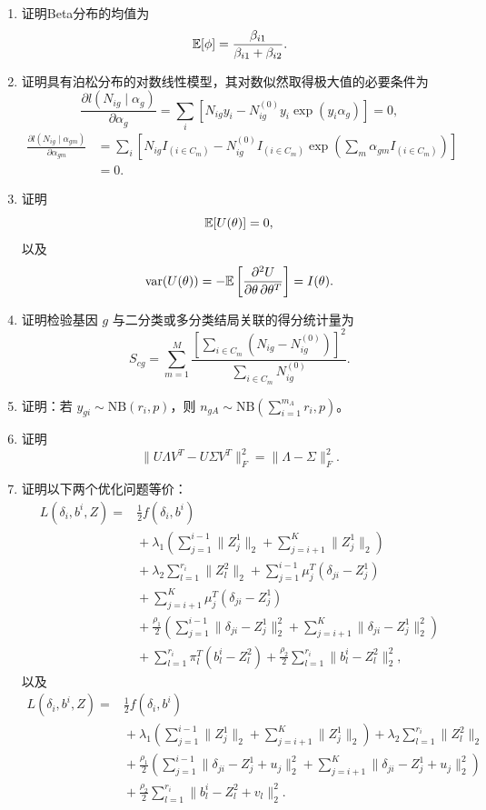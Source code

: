 \begin{enumerate}[label=\textbf{习题\arabic*.},leftmargin=5em]
\item 证明Beta分布的均值为
\[
\mathbb{E}[\phi]=\frac{\beta_{i1}}{\beta_{i1}+\beta_{i2}}.
\]
\item 证明具有泊松分布的对数线性模型，其对数似然取得极大值的必要条件为
\[
\frac{\partial l(N_{ig}\mid\alpha_g)}{\partial\alpha_g}
=\sum_i[N_{ig}y_i-N_{ig}^{(0)}y_i\exp(y_i\alpha_g)]=0,
\]
\[
\begin{aligned}
\frac{\partial l(N_{ig}\mid\alpha_{gm})}{\partial\alpha_{gm}}
&=\sum_i\left[N_{ig}I_{(i\in C_m)}-N_{ig}^{(0)}I_{(i\in C_m)}
\exp\left(\sum_m\alpha_{gm}I_{(i\in C_m)}\right)\right]\\
&=0.
\end{aligned}
\]
\item 证明
\[
\mathbb{E}[U(\theta)]=0,
\]
以及
\[
\operatorname{var}(U(\theta))=-\mathbb{E}\left[
\frac{\partial^2U}{\partial\theta\,\partial\theta^T}\right]=I(\theta).
\]
\item 证明检验基因 $g$ 与二分类或多分类结局关联的得分统计量为
\[
S_{cg}=\sum_{m=1}^{M}\frac{
\left[\sum_{i\in C_m}(N_{ig}-N_{ig}^{(0)})\right]^2}{
\sum_{i\in C_m}N_{ig}^{(0)}}.
\]
\item 证明：若 $y_{gi}\sim\mathrm{NB}(r_i,p)$，则
$n_{gA}\sim\mathrm{NB}(\sum_{i=1}^{m_A}r_i,p)$。

\item 证明
\[
\|U\Lambda V^T-U\Sigma V^T\|_F^2=\|\Lambda-\Sigma\|_F^2.
\]
\item 证明以下两个优化问题等价：
\[
\begin{aligned}
L(\delta_i,b^i,Z)={}&\frac12f(\delta_i,b^i)\\
&{}+\lambda_1\left(\sum_{j=1}^{i-1}\|Z_j^1\|_2+\sum_{j=i+1}^{K}\|Z_j^1\|_2\right)\\
&{}+\lambda_2\sum_{l=1}^{r_i}\|Z_l^2\|_2
+\sum_{j=1}^{i-1}\mu_j^T(\delta_{ji}-Z_j^1)\\
&{}+\sum_{j=i+1}^{K}\mu_j^T(\delta_{ji}-Z_j^1)\\
&{}+\frac{\rho_1}{2}\left(\sum_{j=1}^{i-1}\|\delta_{ji}-Z_j^1\|_2^2
+\sum_{j=i+1}^{K}\|\delta_{ji}-Z_j^1\|_2^2\right)\\
&{}+\sum_{l=1}^{r_i}\pi_l^T(b_l^i-Z_l^2)
+\frac{\rho_2}{2}\sum_{l=1}^{r_i}\|b_l^i-Z_l^2\|_2^2,
\end{aligned}
\]
以及
\[
\begin{aligned}
L(\delta_i,b^i,Z)={}&\frac12f(\delta_i,b^i)\\
&{}+\lambda_1\left(\sum_{j=1}^{i-1}\|Z_j^1\|_2+\sum_{j=i+1}^{K}\|Z_j^1\|_2\right)
+\lambda_2\sum_{l=1}^{r_i}\|Z_l^2\|_2\\
&{}+\frac{\rho_1}{2}\left(\sum_{j=1}^{i-1}\|\delta_{ji}-Z_j^1+u_j\|_2^2
+\sum_{j=i+1}^{K}\|\delta_{ji}-Z_j^1+u_j\|_2^2\right)\\
&{}+\frac{\rho_2}{2}\sum_{l=1}^{r_i}\|b_l^i-Z_l^2+v_l\|_2^2.
\end{aligned}
\]
\end{enumerate}
